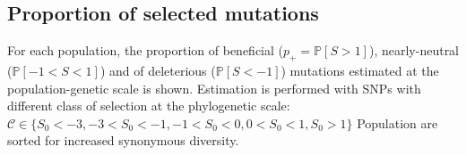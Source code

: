 \documentclass{article}
\newcommand{\proba}{\mathbb{P}}
\newcommand{\Sphy}{S_{0}}
\newcommand{\Sphyclass}{\mathcal{C}}
\newcommand{\divStrongDel}{\Sphy < -3}
\newcommand{\divDel}{-3 < \Sphy < -1}
\newcommand{\divWeakDel}{-1 < \Sphy < 0}
\newcommand{\divWeakAdv}{0 < \Sphy < 1}
\newcommand{\divAdv}{ \Sphy > 1}
\newcommand{\Spop}{S}
\newcommand{\polyDel}{\Spop < -1}
\newcommand{\polyNeutral}{-1 < \Spop < 1}
\newcommand{\polyAdv}{ \Spop > 1}
\newcommand{\PpolyDel}{\proba \left[ \polyDel \right]}
\newcommand{\PpolyNeutral}{\proba \left[ \polyNeutral \right]}
\newcommand{\PpolyAdv}{\proba \left[ \polyAdv \right]}
\begin{document}

    \subsection{Proportion of selected mutations}

    For each population, the proportion of beneficial ($p_+=\PpolyAdv$), nearly-neutral ($\PpolyNeutral$) and of deleterious ($\PpolyDel$) mutations estimated at the population-genetic scale is shown.
    Estimation is performed with SNPs with different class of selection at the phylogenetic scale: $\Sphyclass \in \{ \divStrongDel, \divDel, \divWeakDel, \divWeakAdv, \divAdv \}$
    Population are sorted for increased synonymous diversity.
\end{document}

